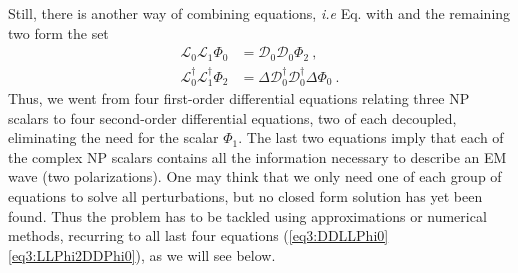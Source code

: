 Still, there is another way of combining equations, \emph{i.e} Eq.  with  and the remaining two form the set
\begin{align}
    \label{eq3:LLPhi0DDPhi2}
    \mathscr{L}_0 \mathscr{L}_1 \Phi_0 &= \mathscr{D}_0 \mathscr{D}_0 \Phi_2 ~,\\
    \label{eq3:LLPhi2DDPhi0}
    \mathscr{L}^\dagger_0 \mathscr{L}^\dagger_1 \Phi_2 &= \Delta \mathscr{D}^\dagger_0 \mathscr{D}^\dagger_0 \Delta \Phi_0 ~.
\end{align}
Thus, we went from four first-order differential equations relating three NP scalars to four second-order differential equations, two of each decoupled, eliminating the need for the scalar $\Phi_1$.
The last two equations imply that each of the complex NP scalars contains all the information necessary to describe an EM wave (two polarizations).
One may think that we only need one of each group of equations to solve all perturbations, but no closed form solution has yet been found.
Thus the problem has to be tackled using approximations or numerical methods, recurring to all last four equations (\ref{eq3:DDLLPhi0}\textendash\ref{eq3:LLPhi2DDPhi0}), as we will see below.

